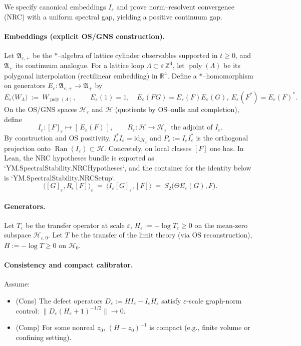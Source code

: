 \documentclass[11pt]{amsart}
\begin{document}
We specify canonical embeddings $I_{\varepsilon}$ and prove norm–resolvent convergence (NRC) with a uniform spectral gap, yielding a positive continuum gap.

\paragraph{Embeddings (explicit OS/GNS construction).}
Let $\mathfrak A_{\varepsilon,+}$ be the $*$–algebra of lattice cylinder observables supported in $t\ge 0$, and $\mathfrak A_+$ its continuum analogue. For a lattice loop $\Lambda\subset\varepsilon\,\mathbb Z^4$, let $\operatorname{poly}(\Lambda)$ be its polygonal interpolation (rectilinear embedding) in $\mathbb R^4$. Define a $*$–homomorphism on generators $E_{\varepsilon}:\mathfrak A_{\varepsilon,+}\to\mathfrak A_+$ by
\[
  E_{\varepsilon}\bigl(W_{\Lambda}\bigr)\ :=\ W_{\operatorname{poly}(\Lambda)},\qquad E_{\varepsilon}(1)=1,\quad E_{\varepsilon}(FG)=E_{\varepsilon}(F)E_{\varepsilon}(G),\ E_{\varepsilon}(F^*)=E_{\varepsilon}(F)^*.
\]
On the OS/GNS spaces $\mathcal H_{\varepsilon}$ and $\mathcal H$ (quotients by OS–nulls and completion), define
\[
  I_{\varepsilon}:[F]_{\varepsilon}\mapsto [\,E_{\varepsilon}(F)\,],\qquad R_{\varepsilon}:\mathcal H\to\mathcal H_{\varepsilon}\ \text{ the adjoint of }I_{\varepsilon}.
\]
By construction and OS positivity, $I_{\varepsilon}^*I_{\varepsilon}=\mathrm{id}_{\mathcal H_{\varepsilon}}$ and $P_{\varepsilon}:=I_{\varepsilon}I_{\varepsilon}^*$ is the orthogonal projection onto $\operatorname{Ran}(I_{\varepsilon})\subset\mathcal H$. Concretely, on local classes $[F]$ one has. In Lean, the NRC hypotheses bundle is exported as `YM.SpectralStability.NRCHypotheses`, and the container for the identity below is `YM.SpectralStability.NRCSetup`.
\[
  \langle [G]_{\varepsilon}, R_{\varepsilon}[F]\rangle_{\varepsilon}\ =\ \langle I_{\varepsilon}[G]_{\varepsilon}, [F]\rangle\ =\ S_2\bigl(\Theta E_{\varepsilon}(G), F\bigr).
\]

\paragraph{Generators.}
Let $T_{\varepsilon}$ be the transfer operator at scale $\varepsilon$, $H_{\varepsilon}:=-\log T_{\varepsilon}\ge 0$ on the mean-zero subspace $\mathcal H_{\varepsilon,0}$. Let $T$ be the transfer of the limit theory (via OS reconstruction), $H:=-\log T\ge 0$ on $\mathcal H_0$.

\paragraph{Consistency and compact calibrator.}
Assume:
\begin{itemize}
  \item (Cons) The defect operators $D_{\varepsilon}:=H I_{\varepsilon}-I_{\varepsilon} H_{\varepsilon}$ satisfy $\varepsilon$-scale graph-norm control: $\|D_{\varepsilon}(H_{\varepsilon}+1)^{-1/2}\|\to 0$.
  \item (Comp) For some nonreal $z_0$, $(H-z_0)^{-1}$ is compact (e.g., finite volume or confining setting).
\end{itemize}
\end{document}
